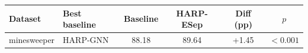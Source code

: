 \begin{tabular}{llcccc}
\toprule
Dataset & Best baseline & Baseline & HARP-ESep & Diff (pp) & $p$ \\
\midrule
minesweeper & HARP-GNN & 88.18 & 89.64 & +1.45 & $<0.001$ \\
\bottomrule
\end{tabular}
